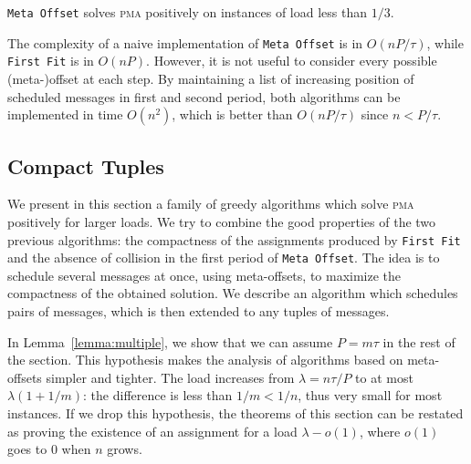 \documentclass[a4paper,UKenglish,cleveref, autoref, thm-restate]{lipics-v2019}
\newcommand\pma{\textsc{pma}\xspace}
\newcommand\firstfit{\texttt{First Fit}\xspace}
\newcommand\metaoffset{\texttt{Meta Offset}\xspace}
\begin{document}
\begin{theorem}\label{th:metaoffset}
\metaoffset solves \pma positively on instances of load less than $1/3$.
\end{theorem}

The complexity of a naive implementation of \metaoffset is in $O(n P/\tau)$, while \firstfit is in $O(nP)$. However, it is not useful to consider every possible (meta-)offset at each step. By maintaining a list of increasing position of scheduled messages in first and second period, both algorithms can be implemented in time $O(n^2)$, which is better than $O(n P/\tau)$ since $n < P/\tau$.

\subsection{Compact Tuples}

We present in this section a family of greedy algorithms which solve \pma positively for larger loads. We try to combine the good properties of the two previous algorithms: the compactness of the assignments produced by \firstfit and the absence of collision in the first period of \metaoffset. The idea is to schedule several messages at once, using meta-offsets, to maximize the compactness of the obtained solution. We describe an algorithm which schedules pairs of messages, which is then extended to any tuples of messages.


In Lemma~\ref{lemma:multiple}, we show that we can assume $P = m\tau$ in the rest of the section. This hypothesis makes the analysis of algorithms based on meta-offsets simpler and tighter. The load increases from $\lambda = n \tau / P$ to at most $\lambda (1 + 1/m)$: the difference is less than $1/m < 1/n$, thus very small for most instances. If we drop this hypothesis, the theorems of this section
can be restated as proving the existence of an assignment for a load $\lambda - o(1)$, where $o(1)$ goes to $0$ when $n$ grows. 
\end{document}
